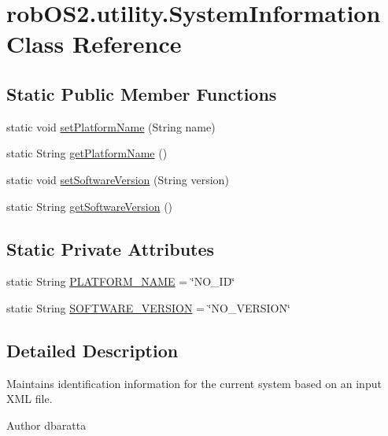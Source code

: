 \hypertarget{classrob_o_s2_1_1utility_1_1_system_information}{
\section{robOS2.utility.SystemInformation Class Reference}
\label{classrob_o_s2_1_1utility_1_1_system_information}
}
\subsection*{Static Public Member Functions}
\begin{DoxyCompactItemize}
\item 
static void \hyperlink{classrob_o_s2_1_1utility_1_1_system_information_ac25b662536acfb1b061d6e6a338b0830}{setPlatformName} (String name)
\item 
static String \hyperlink{classrob_o_s2_1_1utility_1_1_system_information_a18dbb2f71b64ce0cb3e988f13d7923a9}{getPlatformName} ()
\item 
static void \hyperlink{classrob_o_s2_1_1utility_1_1_system_information_a5fa54714a9b8ad116ddd8c9c61cce0d7}{setSoftwareVersion} (String version)
\item 
static String \hyperlink{classrob_o_s2_1_1utility_1_1_system_information_aa1472aeefa4edd8d2d3f7a758ac8111f}{getSoftwareVersion} ()
\end{DoxyCompactItemize}
\subsection*{Static Private Attributes}
\begin{DoxyCompactItemize}
\item 
static String \hyperlink{classrob_o_s2_1_1utility_1_1_system_information_a1cc5883fedf8c1378e2a7610c367ef06}{PLATFORM\_\-NAME} = \char`\"{}NO\_\-ID\char`\"{}
\item 
static String \hyperlink{classrob_o_s2_1_1utility_1_1_system_information_a76fe6989d850779270a2152b803368b5}{SOFTWARE\_\-VERSION} = \char`\"{}NO\_\-VERSION\char`\"{}
\end{DoxyCompactItemize}


\subsection{Detailed Description}
Maintains identification information for the current system based on an input XML file.

\begin{DoxyAuthor}{Author}
dbaratta 
\end{DoxyAuthor}


